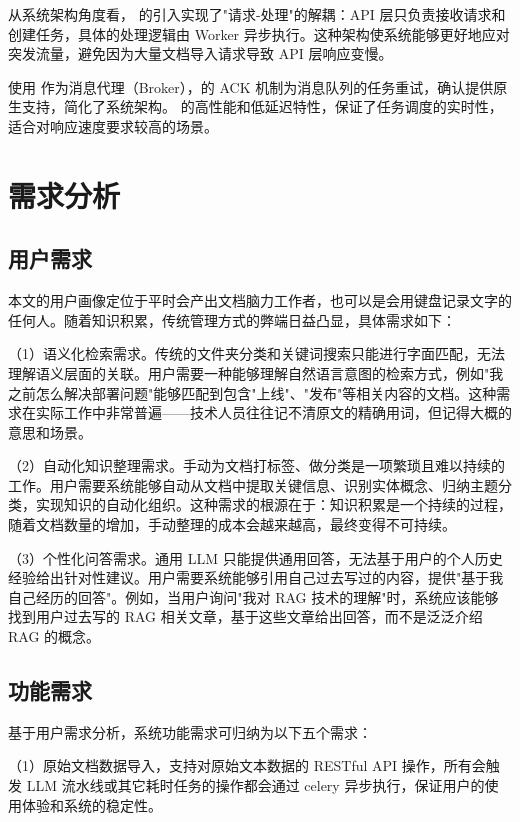 从系统架构角度看， 的引入实现了"请求-处理"的解耦：API 层只负责接收请求和创建任务，具体的处理逻辑由 Worker 异步执行。这种架构使系统能够更好地应对突发流量，避免因为大量文档导入请求导致 API 层响应变慢。

 使用  作为消息代理（Broker），的 ACK 机制为消息队列的任务重试，确认提供原生支持，简化了系统架构。 的高性能和低延迟特性，保证了任务调度的实时性，适合对响应速度要求较高的场景。

\newpage

\section{需求分析}

\subsection{用户需求}

本文的用户画像定位于平时会产出文档脑力工作者，也可以是会用键盘记录文字的任何人。随着知识积累，传统管理方式的弊端日益凸显，具体需求如下：

（1）语义化检索需求。传统的文件夹分类和关键词搜索只能进行字面匹配，无法理解语义层面的关联。用户需要一种能够理解自然语言意图的检索方式，例如"我之前怎么解决部署问题"能够匹配到包含"上线"、"发布"等相关内容的文档。这种需求在实际工作中非常普遍——技术人员往往记不清原文的精确用词，但记得大概的意思和场景。

（2）自动化知识整理需求。手动为文档打标签、做分类是一项繁琐且难以持续的工作。用户需要系统能够自动从文档中提取关键信息、识别实体概念、归纳主题分类，实现知识的自动化组织。这种需求的根源在于：知识积累是一个持续的过程，随着文档数量的增加，手动整理的成本会越来越高，最终变得不可持续。

（3）个性化问答需求。通用 LLM 只能提供通用回答，无法基于用户的个人历史经验给出针对性建议。用户需要系统能够引用自己过去写过的内容，提供"基于我自己经历的回答"。例如，当用户询问"我对 RAG 技术的理解"时，系统应该能够找到用户过去写的 RAG 相关文章，基于这些文章给出回答，而不是泛泛介绍 RAG 的概念。

\subsection{功能需求}

基于用户需求分析，系统功能需求可归纳为以下五个需求：

（1）原始文档数据导入，支持对原始文本数据的 RESTful API 操作，所有会触发 LLM 流水线或其它耗时任务的操作都会通过 celery 异步执行，保证用户的使用体验和系统的稳定性。

